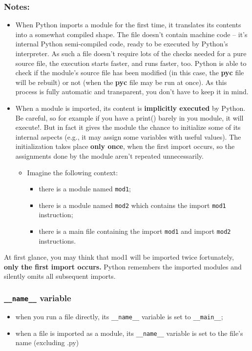 \documentclass[11pt]{article}
\begin{document}
\subsubsection{Notes:}
\label{sec:orgc439d22}
\begin{itemize}
\item When Python imports a module for the first time, it translates
its contents into a somewhat compiled shape. The file doesn’t contain
machine code – it’s internal Python semi-compiled code, ready to be
executed by Python’s interpreter. As such a file doesn’t require lots
of the checks needed for a pure source file, the execution starts
faster, and runs faster, too. Python is able to check if the module’s
source file has been modified (in this case, the \textbf{pyc} file will be
rebuilt) or not (when the \textbf{pyc} file may be run at once). As this
process is fully automatic and transparent, you don’t have to keep it
in mind.

\item When a module is imported, its content is \textbf{implicitly
executed} by Python. Be careful, so for example if you have a print()
barely in you module, it will execute!. But in fact it gives the
module the chance to initialize some of its internal aspects (e.g., it
may assign some variables with useful values). The initialization
takes place \textbf{only once}, when the first import occurs, so the
assignments done by the module aren’t repeated unnecessarily.

\begin{itemize}
\item Imagine the following context:

\begin{itemize}
\item there is a module named \texttt{mod1};
\item there is a module named \texttt{mod2} which contains the import \texttt{mod1}
instruction;
\item there is a main file containing the import \texttt{mod1} and import \texttt{mod2}
instructions.
\end{itemize}
\end{itemize}
\end{itemize}

At first glance, you may think that mod1 will be imported twice
fortunately, \textbf{only the first import occurs.} Python remembers the
imported modules and silently omits all subsequent imports.

\subsubsection{\texttt{\_\_name\_\_} variable}
\label{sec:org80911e7}
\begin{itemize}
\item when you run a file directly, its \texttt{\_\_name\_\_} variable is set to
\texttt{\_\_main\_\_};
\item when a file is imported as a module, its \texttt{\_\_name\_\_} variable is set to
the file’s name (excluding .py)
\end{itemize}
\end{document}
